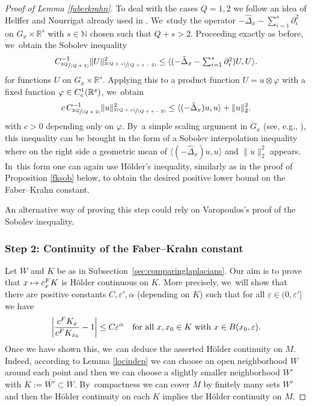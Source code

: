 \documentclass[11pt]{article}
\newcommand\mto{\mathchoice{\longmapsto}{\mapsto}{\mapsto}{\mapsto}}
\let\oldsfrac\sfrac
\renewcommand{\sfrac}[2]{{\oldsfrac{#1}{#2}}}
\newcommand{\spfrac}[2]{{\sfrac{#1}{(#2)}}}
\newcommand{\rc}{\textup{c}}
\newcommand{\FK}{\textup{FK}}
\theoremstyle{definition}
\let\epsilon\varepsilon
\let\phi\varphi
\newcommand{\1}{\mathbbm{1}}
\newcommand{\N}{\mathbb{N}}
\newcommand{\R}{\mathbb{R}}
\numberwithin{equation}{section}
\begin{document}
\begin{proof}[Proof of Lemma \ref{faberkrahn}]
To deal with the cases $Q=1,2$ we follow an idea of Helffer and Nourrigat already used in \cite{Rot}. We~study the operator $-\hat\Delta_x - \sum_{i=1}^s \partial_i^2$ on $G_x\times\R^s$ with $s\in\N$ chosen such that $Q+s>2$. Proceeding exactly as before, we~obtain the Sobolev inequality
\[
C_{\spfrac{2Q}{Q+2}}^{-1} \| U \|_{\spfrac{2(Q+s)}{Q+s-2}}^2 \leq \langle (-\hat\Delta_x - \textstyle\sum_{i=1}^s \partial_i^2) U,U \rangle.
\]
for functions $U$ on $G_x\times\R^s$. Applying this to a product function $U = u\otimes \phi$ with a fixed function $\phi\in C^1_\rc(\R^s)$, we~obtain
\[
c\,C_{\spfrac{2Q}{Q+2}}^{-1} \| u \|_{\spfrac{2(Q+s)}{Q+s-2}}^2 \leq \langle (-\hat\Delta_x) u, u \rangle + \|u\|_2^2.
\]
with $c>0$ depending only on $\phi$. By~a simple scaling argument in $G_x$ (see, e.g., \cite[Rem.\,2.47]{FLW}), this inequality can be brought in the form of a Sobolev interpolation inequality where on the right side a geometric mean of $\langle (-\hat\Delta_x) u, u \rangle$ and $\|u\|_2^2$ appears. In~this form one can again use Hölder's inequality, similarly as in the proof of Proposition \ref{fksob} below, to obtain the desired positive lower bound on the Faber--Krahn constant.

An alternative way of proving this step could rely on Varopoulos's proof \cite{Va} of the Sobolev inequality.

\subsubsection*{Step 2: Continuity of the Faber--Krahn constant\protect\footnotemark}
Let $W$ and $K$ be as in Subsection~\ref{sec:comparinglaplacians}. Our aim is to prove that $x\mto c_x^\FK$ is Hölder continuous on $K$. More precisely, we~will show that there are positive constants $C,\epsilon',\alpha$ (depending on $K$) such that for all $\epsilon\in(0,\epsilon']$ we have
\begin{equation}
\label{eq:fkholder}
\left| \frac{c^\FK_x}{c^\FK_{x_0}} - 1\right| \leq C \epsilon^\alpha
\quad\text{for all}\ x,x_0\in K \ \text{with}\ x\in B(x_0,\epsilon).
\end{equation}
Once we have shown this, we~can deduce the asserted Hölder continuity on $M$. Indeed, according to Lemma \ref{locindep} we can choose an open neighborhood $W$ around each point and then we can choose a slightly smaller neighborhood $W'$ with $K:=\overline{W'}\subset W$. By~compactness we can cover $M$ by finitely many sets $W'$ and then the Hölder continuity on each $K$ implies the Hölder continuity on $M$.


\end{proof}
\end{document}
